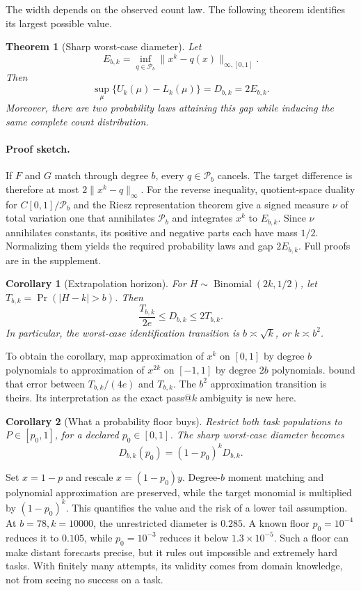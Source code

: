 \documentclass[twoside]{article}
\newtheorem{theorem}{Theorem}
\newtheorem{corollary}{Corollary}
\newcommand{\Pcal}{\mathcal P}
\begin{document}
The width depends on the observed count law. The following theorem identifies its largest possible value.

\begin{theorem}[Sharp worst-case diameter]
\label{thm:diameter}
Let \[ E_{b,k}=\inf_{q\in\Pcal_b}\|x^k-q(x)\|_{\infty,[0,1]}. \] Then \[ \sup_{\mu}\{U_k(\mu)-L_k(\mu)\}=D_{b,k}=2E_{b,k}. \] Moreover, there are two probability laws attaining this gap while inducing the same complete count distribution.
\end{theorem}

\paragraph{Proof sketch.}
If \(F\) and \(G\) match through degree \(b\), every \(q\in\Pcal_b\) cancels. The target difference is therefore at most \(2\|x^k-q\|_\infty\). For the reverse inequality, quotient-space duality for \(C[0,1]/\Pcal_b\) and the Riesz representation theorem give a signed measure \(\nu\) of total variation one that annihilates \(\Pcal_b\) and integrates \(x^k\) to \(E_{b,k}\). Since \(\nu\) annihilates constants, its positive and negative parts each have mass \(1/2\). Normalizing them yields the required probability laws and gap \(2E_{b,k}\). Full proofs are in the supplement.

\begin{corollary}[Extrapolation horizon]
\label{cor:horizon}
For \(H\sim\operatorname{Binomial}(2k,1/2)\), let \(T_{b,k}=\Pr(|H-k|>b)\). Then \[ \frac{T_{b,k}}{2e}\leq D_{b,k}\leq 2T_{b,k}. \] In particular, the worst-case identification transition is \(b\asymp\sqrt{k}\), or \(k\asymp b^2\).
\end{corollary}

To obtain the corollary, map approximation of \(x^k\) on \([0,1]\) by degree \(b\) polynomials to approximation of \(x^{2k}\) on \([-1,1]\) by degree \(2b\) polynomials. \citet{newman1976} bound that error between \(T_{b,k}/(4e)\) and \(T_{b,k}\). The \(b^2\) approximation transition is theirs. Its interpretation as the exact pass@\(k\) ambiguity is new here.

\begin{corollary}[What a probability floor buys]
\label{cor:floor}
Restrict both task populations to \(P\in[p_0,1]\), for a declared \(p_0\in[0,1]\). The sharp worst-case diameter becomes \[ D_{b,k}(p_0)=(1-p_0)^kD_{b,k}. \]
\end{corollary}

Set \(x=1-p\) and rescale \(x=(1-p_0)y\). Degree-\(b\) moment matching and polynomial approximation are preserved, while the target monomial is multiplied by \((1-p_0)^k\). This quantifies the value and the risk of a lower tail assumption. At \(b=78,k=10000\), the unrestricted diameter is \(0.285\). A known floor \(p_0=10^{-4}\) reduces it to \(0.105\), while \(p_0=10^{-3}\) reduces it below \(1.3\times10^{-5}\). Such a floor can make distant forecasts precise, but it rules out impossible and extremely hard tasks. With finitely many attempts, its validity comes from domain knowledge, not from seeing no success on a task.
\end{document}
